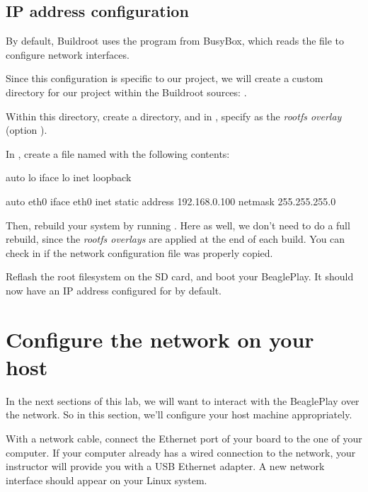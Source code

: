 \subsection{IP address configuration}

By default, Buildroot uses the  program from BusyBox, which
reads the  file to configure network
interfaces.

Since this configuration is specific to our project, we will create a
custom directory for our project within the Buildroot sources:
.

Within this directory, create a  directory, and
in , specify
 as the {\em rootfs
  overlay} (option ).

In , create a file named
 with the following contents:

\begin{fileinput}
auto lo
iface lo inet loopback

auto eth0
iface eth0 inet static
      address 192.168.0.100
      netmask 255.255.255.0
\end{fileinput}

Then, rebuild your system by running . Here as well, we
don't need to do a full rebuild, since the {\em rootfs overlays} are
applied at the end of each build. You can check in
 if the network configuration file
was properly copied.

Reflash the root filesystem on the SD card, and boot your BeaglePlay.
It should now have an IP address configured for  by default.

\section{Configure the network on your host}

In the next sections of this lab, we will want to interact with the
BeaglePlay over the network. So in this section, we'll configure your
host machine appropriately.

With a network cable, connect the Ethernet port of your board to the
one of your computer. If your computer already has a wired connection
to the network, your instructor will provide you with a USB Ethernet
adapter. A new network interface should appear on your Linux system.

